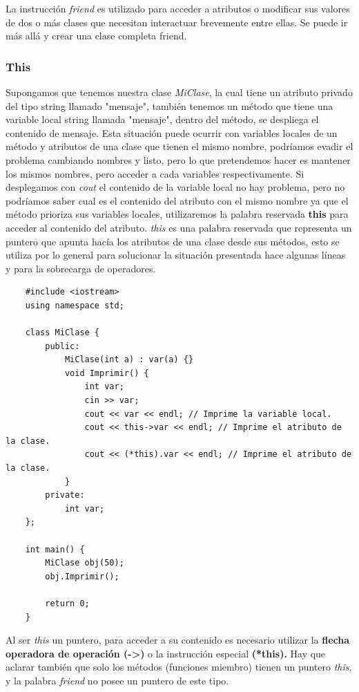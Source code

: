 La instrucción \textit{friend} es utilizado para acceder a atributos o modificar sus valores de dos o más clases que necesitan interactuar brevemente entre ellas. Se puede ir más allá y crear una clase completa friend.


\subsubsection{This}
\hspace{0.55cm}Supongamos que tenemos nuestra clase \textit{MiClase}, la cual tiene un atributo privado del tipo string llamado "mensaje", también tenemos un método que tiene una variable local string llamada "mensaje", dentro del método, se despliega el contenido de mensaje. Esta situación puede ocurrir con variables locales de un método y atributos de una clase que tienen el mismo nombre, podríamos evadir el problema cambiando nombres y listo, pero lo que pretendemos hacer es mantener los mismos nombres, pero acceder a cada variables respectivamente. Si desplegamos con \textit{cout} el contenido de la variable local no hay problema, pero no podríamos saber cual es el contenido del atributo con el mismo nombre ya que el método prioriza sus variables locales, utilizaremos la palabra reservada \textbf{this} para acceder al contenido del atributo. \textit{this} es una palabra reservada que representa un puntero que apunta hacía los atributos de una clase desde sus métodos, esto se utiliza por lo general para solucionar la situación presentada hace algunas líneas y para la sobrecarga de operadores.
\begin{lstlisting}
    #include <iostream>
    using namespace std;

    class MiClase {
        public:
            MiClase(int a) : var(a) {}
            void Imprimir() {
                int var;
                cin >> var;
                cout << var << endl; // Imprime la variable local.
                cout << this->var << endl; // Imprime el atributo de la clase.
                cout << (*this).var << endl; // Imprime el atributo de la clase.
            }
        private:
            int var;
    };
    
    int main() {
        MiClase obj(50);
        obj.Imprimir();
        
        return 0;
    }
\end{lstlisting}

Al ser \textit{this} un puntero, para acceder a su contenido es necesario utilizar la \textbf{flecha operadora de operación (->)} o la instrucción especial \textbf{(*this).} Hay que aclarar también que solo los métodos (funciones miembro) tienen un puntero \textit{this}, y la palabra \textit{friend} no posee un puntero de este tipo.


